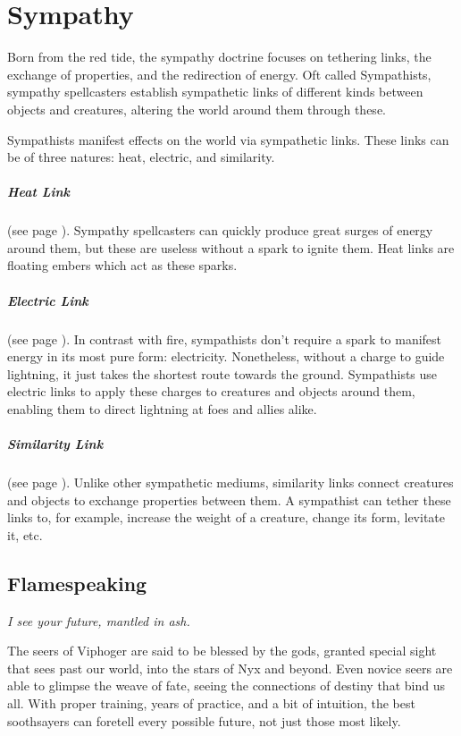 \section{Sympathy} \label{sec::sympathy}

Born from the red tide, the sympathy doctrine focuses on tethering links, the exchange of properties, and the redirection of energy.
Oft called Sympathists, sympathy spellcasters establish sympathetic links of different kinds between objects and creatures, altering the world around them through these.

Sympathists manifest effects on the world via sympathetic links.
These links can be of three natures: heat, electric, and similarity.

\subparagraph{Heat Link}
    (see page \pageref{medium::ember}).
    Sympathy spellcasters can quickly produce great surges of energy around them, but these are useless without a spark to ignite them.
    Heat links are floating embers which act as these sparks.

\subparagraph{Electric Link}
    (see page \pageref{medium::charge}).
    In contrast with fire, sympathists don't require a spark to manifest energy in its most pure form: electricity.
    Nonetheless, without a charge to guide lightning, it just takes the shortest route towards the ground.
    Sympathists use electric links to apply these charges to creatures and objects around them, enabling them to direct lightning at foes and allies alike.

\subparagraph{Similarity Link}
    (see page \pageref{medium::tether}).
    Unlike other sympathetic mediums, similarity links connect creatures and objects to exchange properties between them.
    A sympathist can tether these links to, for example, increase the weight of a creature, change its form, levitate it, etc.

\subsection*{Flamespeaking} \label{ssec::flamespeaking}
    \textit{I see your future, mantled in ash.}

    The seers of Viphoger are said to be blessed by the gods, granted special sight that sees past our world, into the stars of Nyx and beyond.
    Even novice seers are able to glimpse the weave of fate, seeing the connections of destiny that bind us all.
    With proper training, years of practice, and a bit of intuition, the best soothsayers can foretell every possible future, not just those most likely.

